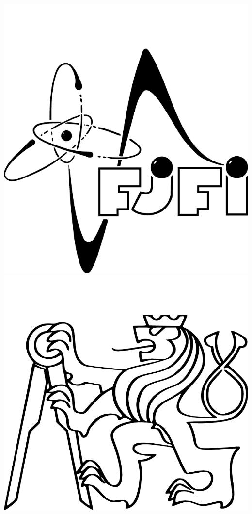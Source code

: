 \documentclass[10pt]{scrartcl}
\begin{document}
\begin{multicols}{2}
\begin{flushright}
\vspace*{-0.3cm}
\includegraphics[scale=0.2]{img/fjfi.pdf}
\hspace{0.4cm}
\includegraphics[scale=0.2]{img/cvut.pdf}
\hspace*{1cm}
\end{flushright}
\end{multicols}
\end{document}
